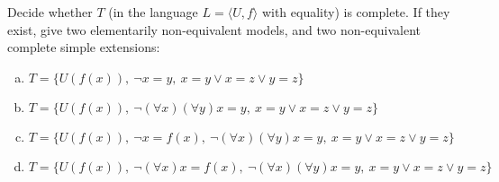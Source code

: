 \begin{problem}

    Decide whether $T$ (in the language $L = \langle U, f \rangle$ with equality) is complete. If they exist, give two elementarily non-equivalent models, and two non-equivalent complete simple extensions:
    \begin{enumerate}[(a)]
        \item  $T = \{U(f(x)),\ \neg x=y,\ x=y\vee x=z\vee y=z\}$
        \item $T = \{U(f(x)),\ \neg (\forall x)(\forall y)x=y,\ x=y\vee x=z\vee y=z\}$
        \item  $T = \{U(f(x)),\ \neg x=f(x),\ \neg (\forall x)(\forall y)x=y,\ x=y\vee x=z\vee y=z\}$
        \item  $T = \{U(f(x)),\ \neg (\forall x) x=f(x),\ \neg (\forall x)(\forall y)x=y,\ x=y\vee x=z\vee y=z\}$
    \end{enumerate}


\end{problem}
